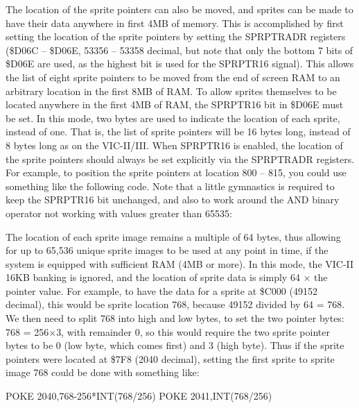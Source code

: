 The location of the sprite pointers can also be moved, and sprites can be made to have their data anywhere in first 4MB of memory.
This is accomplished by first setting the location of the sprite pointers by setting the SPRPTRADR registers (\$D06C -- \$D06E, 53356 -- 53358 decimal, but note that only the bottom 7 bits of \$D06E are used, as the highest bit is used for the SPRPTR16 signal).  This allows the list of
eight sprite pointers to be moved from the end of screen RAM to an arbitrary location in the first 8MB of RAM.  To allow sprites themselves
to be located anywhere in the first 4MB of RAM, the SPRPTR16 bit in \$D06E must be set. In this mode, two bytes are used to indicate the
location of each sprite, instead of one. That is, the list of sprite pointers will be 16 bytes long, instead of 8 bytes long as on the VIC-II/III.  When SPRPTR16 is enabled, the location of the sprite pointers should always be set explicitly via the SPRPTRADR registers.
For example, to position the sprite pointers at location 800 -- 815, you could use something like the following code. Note that a little gymnastics is required to keep the SPRPTR16 bit unchanged, and also to work around the AND binary operator not working with values greater than 65535:


The location of each sprite image remains a multiple of 64 bytes, thus allowing for up to 65,536 unique sprite images
to be used at any point in time, if the system is equipped with sufficient RAM (4MB or more).  In this mode, the VIC-II 16KB banking is ignored, and the location of sprite data is simply 64 $\times$ the pointer value.  For example, to have the data for a sprite at \$C000 (49152 decimal), this would be sprite location 768, because 49152 divided by 64 = 768.  We then need to split 768 into high and low bytes, to set the two pointer bytes: 768 = 256$\times$3, with remainder 0, so this would require the two sprite pointer bytes to be 0 (low byte, which comes first) and 3 (high byte).  Thus if the sprite pointers were located at \$7F8 (2040 decimal), setting the first sprite to sprite image 768 could be done with something like:

\begin{screenoutput}
POKE 2040,768-256*INT(768/256)
POKE 2041,INT(768/256)
\end{screenoutput}

